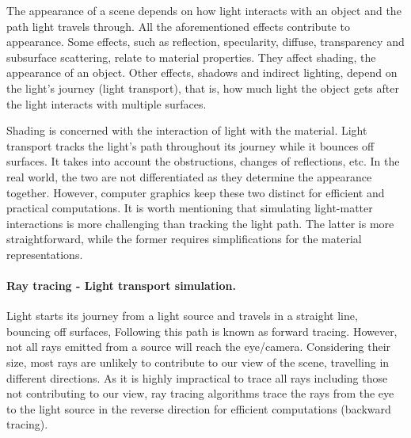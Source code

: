 The appearance of a scene depends on how light interacts with an object and the path light travels through. All the aforementioned effects contribute to appearance. Some effects, such as reflection, specularity, diffuse, transparency and subsurface scattering, relate to material properties. They affect shading, the appearance of an object. Other effects, shadows and indirect lighting, depend on the light's journey (light transport), that is, how much light the object gets after the light interacts with multiple surfaces. 

Shading is concerned with the interaction of light with the material. Light transport tracks the light's path throughout its journey while it bounces off surfaces. It takes into account the obstructions, changes of reflections, etc. In the real world, the two are not differentiated as they determine the appearance together. However, computer graphics keep these two distinct for efficient and practical computations. It is worth mentioning that simulating light-matter interactions is more challenging than tracking the light path. The latter is more straightforward, while the former requires simplifications for the material representations.



\paragraph{Ray tracing - Light transport simulation.}

Light starts its journey from a light source and travels in a straight line, bouncing off surfaces, Following this path is known as forward tracing. However, not all rays emitted from a source will reach the eye/camera. Considering their size, most rays are unlikely to contribute to our view of the scene, travelling in different directions. As it is highly impractical to trace all rays including those not contributing to our view, ray tracing algorithms trace the rays from the eye to the light source in the reverse direction for efficient computations (backward tracing).


